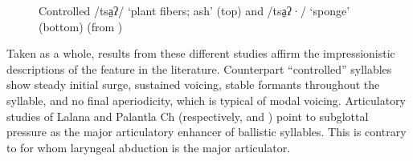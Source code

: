 \documentclass[output=paper]{langscibook}
\begin{document}
  
\begin{figure}
\caption{Controlled /tsa̤ʔ/ ‘plant fibers; ash’ (top) and /tsa̤ʔ·/ ‘sponge’ (bottom) (from \citealt{JP2021})}
\label{fig:dobui:2}
\end{figure}

Taken as a whole, results from these different studies affirm the impressionistic descriptions of the feature in the literature. Counterpart ``controlled'' syllables show steady initial surge, sustained voicing, stable formants throughout the syllable, and no final aperiodicity, which is typical of modal voicing. Articulatory studies of Lalana and Palantla Ch (respectively, \citealt{Mugele1984} and \citealt{MerrifieldEdmondson1999}) point to subglottal pressure as the major articulatory enhancer of ballistic syllables. This is contrary to \citet{Silverman1994} for whom laryngeal abduction is the major articulator.
\end{document}
